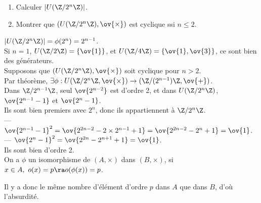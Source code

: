 \documentclass[11pt]{article}
\begin{document}
\begin{exercice}{}{}
    \begin{enumerate}
        \item Calculer $|U(\Z/2^n\Z)|$.
        \item Montrer que $(U(\Z/2^n\Z), \ov{\times})$ est cyclique ssi $n\leq2$.
    \end{enumerate}
    \tcblower
     $|U(\Z/2^n\Z)|=\phi(2^n)=2^{n-1}$.\\
     Si $n=1$, $U(\Z/2\Z)=\{\ov{1}\}$, et $U(\Z/4\Z)=\{\ov{1},\ov{3}\}$, ce sont bien des générateurs.\\
     Supposons que $(U(\Z/2^n\Z),\ov{\times})$ soit cyclique pour $n>2$.\\
    Par théorème, $\exists \phi : U(\Z/2^n\Z,\ov{\times}) \to (\Z/(2^{n-1})\Z,\ov{+})$.\\
    Dans $\Z/2^{n-1}\Z$, seul $\ov{2^{n-2}}$ est d'ordre 2, et dans $U(\Z/2^n\Z)$, $\ov{2^{n-1}-1}$ et $\ov{2^n-1}$.\\
    Ils sont bien premiers avec $2^n$, donc ils appartiennent à $\Z/2^n\Z$.\\
    --- $\ov{2^{n-1}-1}^2=\ov{2^{2n-2}-2\times2^{n-1}+1}=\ov{2^{2n-2}-2^n+1}=\ov{1}$.\\
    --- $\ov{2^n-1}^2=\ov{2^{2n}-2^{n+1}+1}=\ov{1}$.\\
    Ils sont bien d'ordre 2.\\
    On a $\phi$ un isomorphisme de $(A,\times)$ dans $(B,\times)$, si $x\in A, ~ o(x)=p \ra o(\phi(x))=p$.
    \begin{center}\end{center}
    Il y a donc le même nombre d'élément d'ordre $p$ dans $A$ que dans $B$, d'où l'absurdité.
\end{exercice}

\vspace*{-0.8cm}
\end{document}
